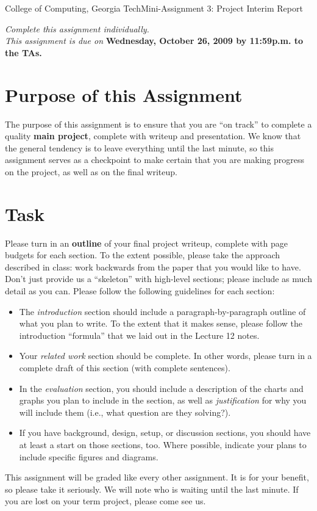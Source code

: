 \documentclass[11pt]{article}
\begin{document}


{College of Computing, Georgia Tech}{Mini-Assignment 3: Project
  Interim Report} 

{\em Complete this assignment individually. \\  This
  assignment is due on} {\bf Wednesday, October 26, 2009 by 11:59p.m. to
  the TAs.}

\section{Purpose of this Assignment}

The purpose of this assignment is to ensure that you are ``on track'' to
complete a quality {\bf main project}, complete with writeup and
presentation.  We know that the general tendency is to leave everything
until the last minute, so this assignment serves as a checkpoint to make
certain that you are making progress on the project, as well as on the
final writeup.

\section{Task}

Please turn in an {\bf outline} of your final project writeup, complete
with page budgets for each section.  To the extent possible, please take
the approach described in class: work backwards from the paper that you
would like to have.  Don't just provide us a ``skeleton'' with
high-level sections; please include as much detail as you can.  Please
follow the following guidelines for each section:
\begin{itemize}
\itemsep=-1pt
\item The {\em introduction} section should include a
  paragraph-by-paragraph outline of what you plan to write.  To the
  extent that it makes sense, please follow the introduction ``formula''
  that we laid out in the Lecture 12 notes.
\item Your {\em related work} section should be complete.  In other
  words, please turn in a complete draft of this section (with complete
  sentences). 
\item In the {\em evaluation} section, you should include a description
  of the charts and graphs you plan to include in the section, as well
  as {\em justification} for why you will include them (i.e., what
  question are they solving?).
\item If you have background, design, setup, or discussion sections, you
  should have at least a start on those sections, too.  Where possible,
  indicate your plans to include specific figures and diagrams.
\end{itemize}
\noindent
This assignment will be graded like every other assignment.  It is for
your benefit, so please take it seriously.  We will note who is waiting
until the last minute.  If you are lost on your term project, please
come see us.
\end{document}
